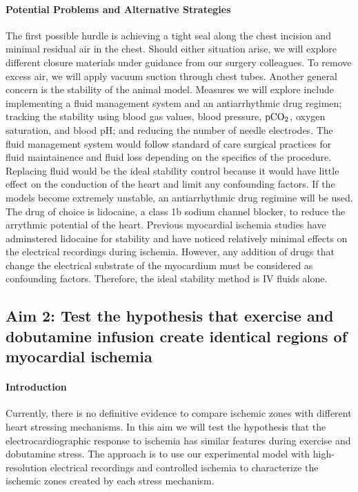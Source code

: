 \paragraph{Potential Problems and Alternative Strategies} The first possible hurdle is achieving a tight seal along the chest incision and minimal residual air in the chest.  Should either situation arise, we will explore different closure materials under guidance from our surgery colleagues. To remove excess air, we will apply vacuum suction through chest tubes. Another general concern is the stability of the animal model. Measures we will explore include implementing a fluid management system and an antiarrhythmic drug regimen; tracking the stability using blood gas values, blood pressure, ${\rm pCO_2}$, oxygen saturation, and blood pH; and reducing the number of needle electrodes. The fluid management system would follow standard of care surgical practices for fluid maintainence and fluid loss depending on the specifics of the procedure. Replacing fluid would be the ideal stability control because it would have little effect on the conduction of the heart and limit any confounding factors. If the models become extremely unstable, an antiarrhythmic drug regimine will be used. The drug of choice is lidocaine, a class 1b sodium channel blocker, to reduce the arrythmic potential of the heart. Previous myocardial ischemia studies have adminstered lidocaine for stability and have noticed relatively minimal effects on the electrical recordings during ischemia. However, any addition of drugs that change the electrical substrate of the myocardium must be considered as confounding factors. Therefore, the ideal stability method is IV fluids alone. 


\subsection{Aim 2: Test the hypothesis that exercise and dobutamine infusion create identical regions of myocardial ischemia}

 \paragraph{Introduction} Currently, there is no definitive evidence to compare ischemic zones with different heart stressing mechanisms. In this aim we will test the hypothesis that the electrocardiographic response to ischemia has similar features during exercise and dobutamine stress. The approach is to use our experimental model  with high-resolution electrical recordings and  controlled ischemia to characterize the ischemic zones created by each stress mechanism. 

